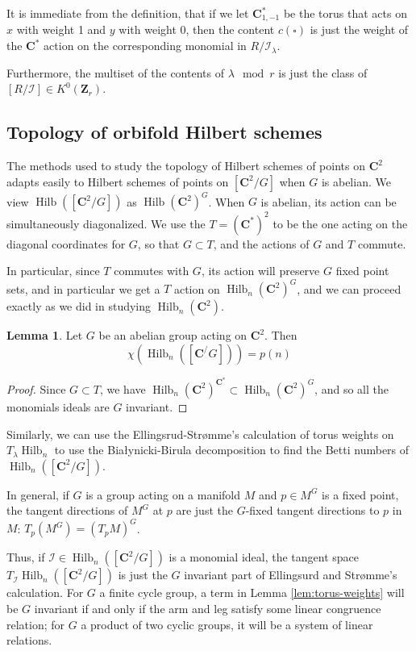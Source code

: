 \documentclass{amsart}[12pt]
\theoremstyle{definition}
\newtheorem{lemma}[dummy]{Lemma}
\newcommand{\Z}{\mathbf{Z}}
\newcommand{\C}{\mathbf{C}}
\newcommand{\II}{\mathcal{I}}
\DeclareMathOperator{\Hilb}{Hilb}
\begin{document}
It is immediate from the definition, that if we let $\C^*_{1,-1}$ be the torus that acts on $x$ with weight 1 and $y$ with weight $0$, then the content $c(\square)$ is just the weight of the $\C^*$ action on the corresponding monomial in $R/\II_\lambda$.

Furthermore, the multiset of the contents of $\lambda \mod r$ is just the class of $[R/\II]\in K^0(\Z_r)$.


\subsection{Topology of orbifold Hilbert schemes}

The methods used to study the topology of Hilbert schemes of points on $\C^2$ adapts easily to Hilbert schemes of points on $[\C^2/G]$ when $G$ is abelian.  We view $\Hilb([\C^2/G])$ as $\Hilb(\C^2)^G$.  When $G$ is abelian, its action can be simultaneously diagonalized.  We use the $T=(\C^*)^2$ to be the one acting on the diagonal coordinates for $G$, so that $G\subset T$, and the actions of $G$ and $T$ commute. 

In particular, since $T$ commutes with $G$, its action will preserve $G$ fixed point sets, and in particular we get a $T$ action on $\Hilb_n(\C^2)^G$, and we can proceed exactly as we did in studying $\Hilb_n(\C^2)$.



\begin{lemma} Let $G$ be an abelian group acting on $\C^2$.  Then
\[ \chi( \Hilb_n([\C^/G]))=p(n) \]
\end{lemma}

\begin{proof}
Since $G\subset T$, we have $\Hilb_n(\C^2)^{\C^*}\subset\Hilb_n(\C^2)^G$, and so all the monomials ideals are $G$ invariant.  
\end{proof}

Similarly, we can use the Ellingsrud-Str\o mme's calculation of torus weights on $T_\lambda\Hilb_n$ to use the Bia\l ynicki-Birula decomposition to find the Betti numbers of $\Hilb_n([\C^2/G])$.  

In general, if $G$ is a group acting on a manifold $M$ and $p\in M^G$ is a fixed point, the tangent directions of $M^G$ at $p$ are just the $G$-fixed tangent directions to $p$ in $M$: $T_p(M^G)=(T_pM)^G$.  

Thus, if $\II\in \Hilb_n([\C^2/G])$ is a monomial ideal, the tangent space $T_{\II}\Hilb_n([\C^2/G])$ is just the $G$ invariant part of Ellingsurd and Str\o mme's calculation.  For $G$ a finite cycle group, a term in Lemma \ref{lem:torus-weights} will be $G$ invariant if and only if the arm and leg satisfy some linear congruence relation; for $G$ a product of two cyclic groups, it will be a system of linear relations.
\end{document}
